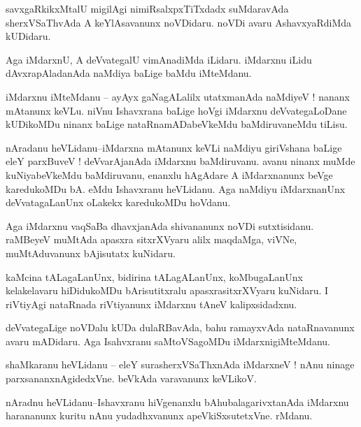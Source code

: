 \documentclass{article}
\begin{document}
\begin{mn}%
savxgaRkikxMtalU migilAgi nimiRsalxpxTiTxdadx suMdaravAda sherxVSaThvAda A keYlAsavanunx 
noVDidaru. noVDi avaru AshavxyaRdiMda kUDidaru.
\end{mn}

\begin{mn}%
Aga iMdarxnU, A deVvategalU vimAnadiMda iLidaru. iMdarxnu iLidu dAvxrapAladanAda naMdiya 
baLige baMdu iMteMdanu.
\end{mn}

\begin{mn}%
iMdarxnu iMteMdanu -- ayAyx gaNagALalilx utatxmanAda naMdiyeV ! nananx mAtanunx keVLu. niVnu 
Ishavxrana baLige hoVgi iMdarxnu deVvategaLoDane kUDikoMDu ninanx baLige 
nataRnamADabeVkeMdu baMdiruvaneMdu tiLisu.
\end{mn}

\begin{mn}%
nAradanu heVLidanu--iMdarxna mAtanunx keVLi naMdiyu giriVshana baLige eleY parxBuveV ! 
deVvarAjanAda iMdarxnu baMdiruvanu. avanu ninanx muMde kuNiyabeVkeMdu baMdiruvanu, enanxlu 
hAgAdare A iMdarxnanunx beVge karedukoMDu bA. eMdu Ishavxranu heVLidanu. Aga naMdiyu 
iMdarxnanUnx deVvatagaLanUnx oLakekx karedukoMDu hoVdanu.
\end{mn}

\begin{mn}%
Aga iMdarxnu vaqSaBa dhavxjanAda shivananunx noVDi sutxtisidanu. raMBeyeV muMtAda apasxra 
sitxrXVyaru alilx maqdaMga, viVNe, muMtAduvanunx bAjisutatx kuNidaru.
\end{mn}

\begin{mn}%
kaMcina tALagaLanUnx, bidirina tALagALanUnx, koMbugaLanUnx kelakelavaru hiDidukoMDu 
bArisutitxralu apasxrasitxrXVyaru kuNidaru. I riVtiyAgi nataRnada riVtiyanunx iMdarxnu 
tAneV kalipxsidadxnu.
\end{mn}

\begin{mn}%
deVvategaLige noVDalu kUDa dulaRBavAda, bahu ramayxvAda nataRnavanunx avaru mADidaru. Aga 
Isahvxranu saMtoVSagoMDu iMdarxnigiMteMdanu.
\end{mn}

\begin{mn}%
shaMkaranu heVLidanu -- eleY surasherxVSaThxnAda iMdarxneV ! nAnu ninage 
parxsananxnAgidedxVne. beVkAda varavanunx keVLikoV.
\end{mn}

\begin{mn}%
nAradnu heVLidanu--Ishavxranu hiVgenanxlu bAhubalagarivxtanAda iMdarxnu harananunx kuritu 
nAnu yudadhxvanunx apeVkiSxsutetxVne. rMdanu.
\end{mn}
\end{document}

